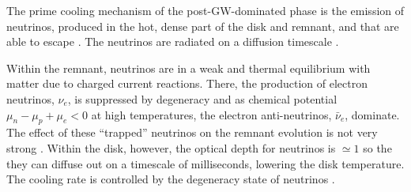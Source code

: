 The prime cooling mechanism of the post-\ac{GW}-dominated phase is the emission of 
neutrinos, produced in the hot, dense part of the disk and remnant, and that are 
able to escape \citep{Eichler:1989ve,Rosswog:2003rv,Sekiguchi:2011zd}. 
The neutrinos are radiated on a diffusion timescale \citep{Perego:2014fma}.

Within the remnant, neutrinos are in a weak and thermal equilibrium with matter 
due to charged current reactions. There, the production of electron neutrinos, $\nu_e$,
is suppressed by degeneracy and as chemical potential $\mu_n-\mu_p+\mu_e<0$ at high temperatures, 
the electron anti-neutrinos, $\bar{\nu}_{e}$, dominate. The effect of these ``trapped'' 
neutrinos on the remnant evolution is not very strong \citep{Foucart:2015gaa,Perego:2019adq}.
%
Within the disk, however, the optical depth for neutrinos is ${\simeq}1$ so 
the they can diffuse out on a timescale of milliseconds, lowering the disk 
temperature. The cooling rate is controlled by the degeneracy state of neutrinos 
\citep{Beloborodov:2008nx}.

